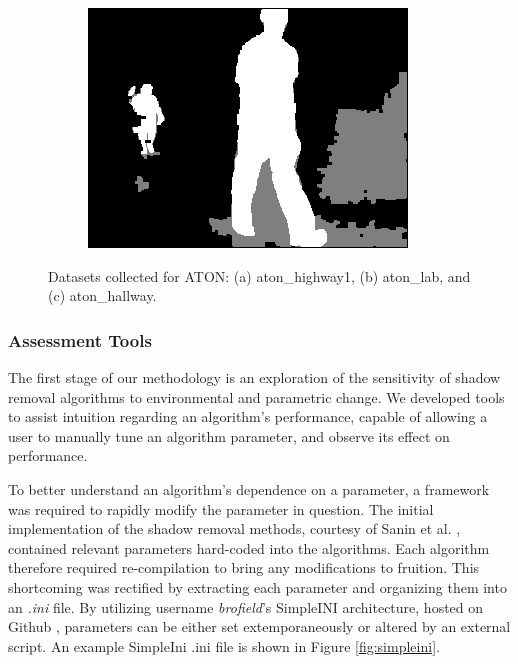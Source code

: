 \begin{figure}
\begin{subfigure}{.3\linewidth}
  \caption{}
\end{subfigure}
\hfill
\begin{subfigure}{.3\linewidth}
  \includegraphics[width=1\linewidth]{figures/hallway_gt_0164.jpg}
  \caption{}
\end{subfigure}

\caption{Datasets collected for ATON: (a) aton\_highway1, (b) aton\_lab, and (c) aton\_hallway.}
\label{fig:datasetsgt}
\end{figure}

\FloatBarrier
\subsubsection{Assessment Tools}

The first stage of our methodology is an exploration of the sensitivity of shadow removal algorithms to environmental and parametric change. We developed tools to assist intuition regarding an algorithm's performance, capable of allowing a user to manually tune an algorithm parameter, and observe its effect on performance.

To better understand an algorithm's dependence on a parameter, a framework was required to rapidly modify the parameter in question. The initial implementation of the shadow removal methods, courtesy of Sanin et al. \cite{shadowssourceforge}, contained relevant parameters hard-coded into the algorithms. Each algorithm therefore required re-compilation to bring any modifications to fruition. This shortcoming was rectified by extracting each parameter and organizing them into an \textit{.ini} file. By utilizing username \textit{brofield}'s SimpleINI architecture, hosted on Github \cite{simpleini}, parameters can be either set extemporaneously or altered by an external script. An example SimpleIni .ini file is shown in Figure \ref{fig:simpleini}.


